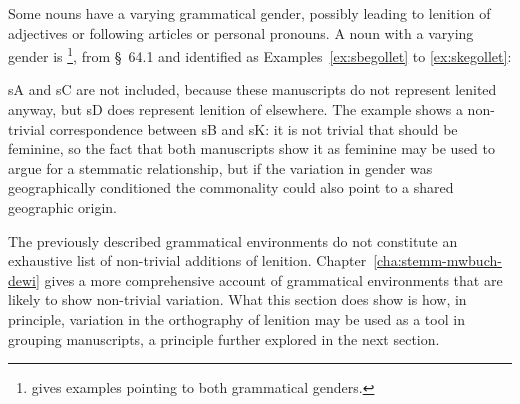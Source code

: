 Some nouns have a varying grammatical gender, possibly leading to lenition of adjectives or following articles or personal pronouns. A noun with a varying gender  is   \footnote{\Textcite[s.v.~]{bevan_geiriadur_2014} gives examples pointing to both grammatical genders.}, from §~64.1 and identified as Examples~\ref{ex:sbegollet} to \ref{ex:skegollet}:
\begin{mwl}
\end{mwl}
\Gls{sA} and \gls{sC} are not included, because these manuscripts do not represent lenited  anyway, but \gls{sD} does represent lenition of  elsewhere. The example shows a non-trivial correspondence between \gls{sB} and \gls{sK}: it is not trivial that  should be feminine, so the fact that both manuscripts show it as feminine may be used to argue for a stemmatic relationship, but if the variation in gender was geographically conditioned the commonality could also point to a shared geographic origin.

The previously described grammatical environments do not constitute an exhaustive list of non-trivial additions of lenition. Chapter~\ref{cha:stemm-mwbuch-dewi} gives a more comprehensive account of grammatical environments that are likely to show non-trivial variation. What this section does show is how, in principle, variation in the orthography of lenition may be used as a tool in grouping manuscripts, a  principle further explored in the next section.


